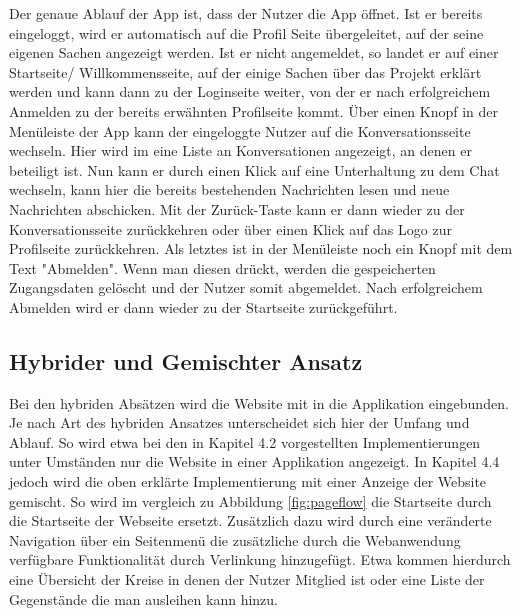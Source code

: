 Der genaue Ablauf der App ist, dass der Nutzer die App öffnet. Ist er bereits eingeloggt, wird er automatisch auf die Profil Seite übergeleitet, auf der seine eigenen Sachen angezeigt werden. Ist er nicht angemeldet, so landet er auf einer Startseite/ Willkommensseite, auf der einige Sachen über das Projekt erklärt werden und kann dann zu der Loginseite weiter, von der er nach erfolgreichem Anmelden zu der bereits erwähnten Profilseite kommt. Über einen Knopf in der Menüleiste der App kann der eingeloggte Nutzer auf die Konversationsseite wechseln. Hier wird im eine Liste an Konversationen angezeigt, an denen er beteiligt ist. Nun kann er durch einen Klick auf eine Unterhaltung zu dem Chat wechseln, kann hier die bereits bestehenden Nachrichten lesen und neue Nachrichten abschicken. Mit der Zurück-Taste kann er dann wieder zu der Konversationsseite zurückkehren oder über einen Klick auf das Logo zur Profilseite zurückkehren. Als letztes ist in der Menüleiste noch ein Knopf mit dem Text "Abmelden". Wenn man diesen drückt, werden die gespeicherten Zugangsdaten gelöscht und der Nutzer somit abgemeldet. Nach erfolgreichem Abmelden wird er dann wieder zu der Startseite zurückgeführt.

\subsection{Hybrider und Gemischter Ansatz}
Bei den hybriden Absätzen wird die Website mit in die Applikation eingebunden. Je nach Art des hybriden Ansatzes unterscheidet sich hier der Umfang und Ablauf. So wird etwa bei den in Kapitel 4.2 vorgestellten Implementierungen unter Umständen nur die Website in einer Applikation angezeigt. In Kapitel 4.4 jedoch wird die oben erklärte Implementierung mit einer Anzeige der Website gemischt. So wird im vergleich zu Abbildung \ref{fig:pageflow} die Startseite durch die Startseite der Webseite ersetzt. Zusätzlich dazu wird durch eine veränderte Navigation über ein Seitenmenü die zusätzliche durch die Webanwendung verfügbare Funktionalität durch Verlinkung hinzugefügt. Etwa kommen hierdurch eine Übersicht der Kreise in denen der Nutzer Mitglied ist oder eine Liste der Gegenstände die man ausleihen kann hinzu.

